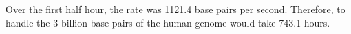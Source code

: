 
Over the first half hour, the rate was 1121.4 base pairs per second.  Therefore, to handle the 3 billion base pairs of the human genome would take 743.1 hours.
